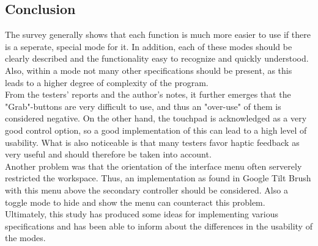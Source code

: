 \documentclass{report}
\begin{document}
		\subsection{Conclusion} \label{IntuitionStudyConclusion}
		\startsubsection
			The survey generally shows that each function is much more easier to use if there is a seperate, special mode for it. In addition, each of these modes should be clearly described and the functionality easy to recognize and quickly understood. Also, within a mode not many other specifications should be present, as this leads to a higher degree of complexity of the program. \\
			From the testers' reports and the author's notes, it further emerges that the "Grab"-buttons are very difficult to use, and thus an "over-use" of them is considered negative. On the other hand, the touchpad is acknowledged as a very good control option, so a good implementation of this can lead to a high level of usability. What is also noticeable is that many testers favor haptic feedback as very useful and should therefore be taken into account. \\
			Another problem was that the orientation of the interface menu often serverely restricted the workspace. Thus, an implementation as found in Google Tilt Brush with this menu above the secondary controller should be considered. Also a toggle mode to hide and show the menu can counteract this problem. \\
			Ultimately, this study has produced some ideas for implementing various specifications and has been able to inform about the differences in the usability of the modes.
			\newpage
\end{document}
